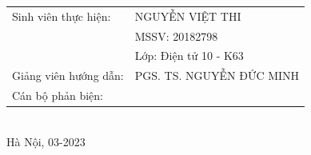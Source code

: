 \begin{titlepage}
\begin{center}
    \begin{tabular}{ l l }
        \fontsize{14pt}{0pt}\selectfont Sinh viên thực hiện: & \fontsize{14pt}{0pt}\selectfont NGUYỄN VIỆT THI  \vspace{0.2cm} \\ 
        & \fontsize{14pt}{0pt}\selectfont MSSV: 20182798 \vspace{0.2cm}\\
        & \fontsize{14pt}{0pt}\selectfont Lớp: Điện tử 10 - K63 \vspace{0.2cm}\\
        \fontsize{14pt}{0pt}\selectfont Giảng viên hướng dẫn: &  \fontsize{14pt}{0pt}\selectfont  PGS. TS. NGUYỄN ĐỨC MINH\vspace{0.2cm}\\
                \fontsize{14pt}{0pt}\selectfont Cán bộ phản biện: &  \fontsize{14pt}{0pt}\selectfont  
    \end{tabular} \\[3cm]
    \fontsize{14pt}{0pt}\selectfont Hà Nội, 03-2023
\end{center}
\end{titlepage} \cleardoublepage
